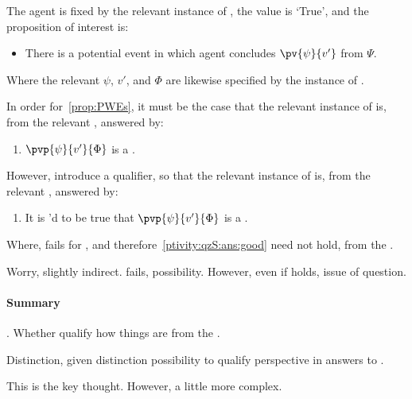 \begin{note}[\ptivity{} \& \qzS{}]
  The agent is fixed by the relevant instance of \qzS{}, the value is `True', and the proposition of interest is:

  \begin{itemize}
  \item[]
    There is a potential event in which agent concludes \(\pv{\psi}{v'}\) from \(\Psi\).
  \end{itemize}

  Where the relevant \(\psi\), \(v'\), and \(\Phi\) are likewise specified by the instance of \qzS{}.

  In order for~\autoref{prop:PWEs}, it must be the case that the relevant instance of \qzS{} is, from the relevant \agpe{}, answered by:

  \begin{enumerate}[label=A., ref=A]
  \item
    \label{ptivity:qzS:ans:good}
    \(\pvp{\psi}{v'}{\Phi}\) is a \fc{}.
  \end{enumerate}

  However, introduce a qualifier, so that the relevant instance of \qzS{} is, from the relevant \agpe{}, answered by:

  \begin{enumerate}[label=A\('\)., ref=A\('\)]
  \item
    \label{ptivity:qzS:ans:bad}
    It is \ptivityQV{}'d to be true that \(\pvp{\psi}{v'}{\Phi}\) is a \fc{}.
  \end{enumerate}

  Where, \ptivity{} fails for \ptivityQV{}, and therefore~\ref{ptivity:qzS:ans:good} need not hold, from the \agpe{}.

  Worry, slightly indirect.
  \ptivity{} fails, possibility.
  However, even if \ptivity{} holds, issue of question.
\end{note}

\paragraph{Summary}

\begin{note}
  \ptivity{}.
  Whether qualify how things are from the \agpe{}.

  Distinction, given distinction possibility to qualify perspective in answers to \qzS{}.

  This is the key thought.
  However, a little more complex.
\end{note}


